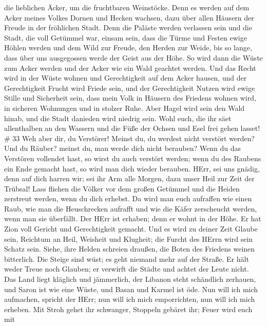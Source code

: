 die lieblichen Äcker, um die fruchtbaren Weinstöcke.  Denn
es werden auf dem Acker meines Volkes Dornen und Hecken wachsen, dazu
über allen Häusern der Freude in der fröhlichen Stadt. 
Denn die Paläste werden verlassen sein und die Stadt, die voll Getümmel
war, einsam sein, dass die Türme und Festen ewige Höhlen werden und dem
Wild zur Freude, den Herden zur Weide,  bis so lange, dass
über uns ausgegossen werde der Geist aus der Höhe. So wird dann die
Wüste zum Acker werden und der Acker wie ein Wald geachtet werden.
 Und das Recht wird in der Wüste wohnen und Gerechtigkeit
auf dem Acker hausen,  und der Gerechtigkeit Frucht wird
Friede sein, und der Gerechtigkeit Nutzen wird ewige Stille und
Sicherheit sein,  dass mein Volk in Häusern des Friedens
wohnen wird, in sicheren Wohnungen und in stolzer Ruhe. 
Aber Hagel wird sein den Wald hinab, und die Stadt danieden wird niedrig
sein.  Wohl euch, die ihr säet allenthalben an den Wassern
und die Füße der Ochsen und Esel frei gehen lasset! \# 33 
Weh aber dir, du Verstörer! Meinst du, du werdest nicht verstört werden?
Und du Räuber? meinst du, man werde dich nicht berauben? Wenn du das
Verstören vollendet hast, so wirst du auch verstört werden; wenn du des
Raubens ein Ende gemacht hast, so wird man dich wieder berauben.
 HErr, sei uns gnädig, denn auf dich harren wir; sei ihr Arm
alle Morgen, dazu unser Heil zur Zeit der Trübsal!  Lass
fliehen die Völker vor dem großen Getümmel und die Heiden zerstreut
werden, wenn du dich erhebst.  Da wird man euch aufraffen
wie einen Raub, wie man die Heuschrecken aufrafft und wie die Käfer
zerscheucht werden, wenn man sie überfällt.  Der HErr ist
erhaben; denn er wohnt in der Höhe. Er hat Zion voll Gericht und
Gerechtigkeit gemacht.  Und es wird zu deiner Zeit Glaube
sein, Reichtum an Heil, Weisheit und Klugheit; die Furcht des HErrn wird
sein Schatz sein.  Siehe, ihre Helden schreien draußen, die
Boten des Friedens weinen bitterlich.  Die Steige sind wüst;
es geht niemand mehr auf der Straße. Er hält weder Treue noch Glauben;
er verwirft die Städte und achtet der Leute nicht.  Das Land
liegt kläglich und jämmerlich, der Libanon steht schändlich zerhauen,
und Saron ist wie eine Wüste, und Basan und Karmel ist öde.
 Nun will ich mich aufmachen, spricht der HErr; nun will
ich mich emporrichten, nun will ich mich erheben.  Mit
Stroh gehet ihr schwanger, Stoppeln gebäret ihr; Feuer wird euch mit
